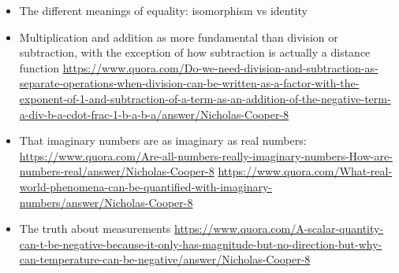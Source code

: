 \documentclass[11pt,twoside,letterpaper,fleqn,parskip=full]{book}
\begin{document}
\begin{itemize}
    \item The different meanings of equality: isomorphism vs identity
    \item Multiplication and addition as more fundamental than division or subtraction, with the exception of how subtraction is actually a distance function
    \url{https://www.quora.com/Do-we-need-division-and-subtraction-as-separate-operations-when-division-can-be-written-as-a-factor-with-the-exponent-of-1-and-subtraction-of-a-term-as-an-addition-of-the-negative-term-a-div-b-a-cdot-frac-1-b-a-b-a/answer/Nicholas-Cooper-8}
    
    \item That imaginary numbers are as imaginary as real numbers:
    \url{https://www.quora.com/Are-all-numbers-really-imaginary-numbers-How-are-numbers-real/answer/Nicholas-Cooper-8}
    \url{https://www.quora.com/What-real-world-phenomena-can-be-quantified-with-imaginary-numbers/answer/Nicholas-Cooper-8}
    
    \item The truth about measurements
    \url{https://www.quora.com/A-scalar-quantity-can-t-be-negative-because-it-only-has-magnitude-but-no-direction-but-why-can-temperature-can-be-negative/answer/Nicholas-Cooper-8}
    
    
\end{itemize}


\printglossaries
\end{document}
